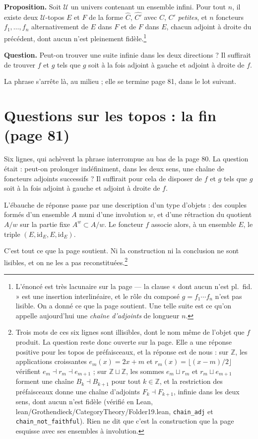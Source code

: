 \documentclass[11pt,a4paper]{article}
\begin{document}
\textbf{Proposition.} Soit $\mathcal{U}$ un univers contenant un ensemble
infini. Pour tout $n$, il existe deux $\mathcal{U}$-topos $E$ et $F$ de la
forme $\widehat{C}$, $\widehat{C'}$ avec $C$, $C'$ \emph{petites}, et $n$
foncteurs $f_{1}, \ldots, f_{n}$ alternativement de $E$ dans $F$ et de $F$ dans
$E$, chacun adjoint à droite du précédent, dont aucun n'est pleinement
fidèle.\footnote{L'énoncé est très lacunaire sur la page — la clause « dont
aucun n'est pl.\ fid. » est une insertion interlinéaire, et le rôle du composé
$g = f_{1}\cdots f_{n}$ n'est pas lisible. On a donné ce que la page
soutient. Une telle suite est ce qu'on appelle aujourd'hui une \emph{chaîne
d'adjoints} de longueur $n$.}

\textbf{Question.} Peut-on trouver une suite infinie dans les deux directions ?
Il suffirait de trouver $f$ et $g$ tels que $g$ soit à la fois adjoint à gauche
et adjoint à droite de $f$.

La phrase s'arrête là, au milieu ; elle se termine page 81, dans le lot
suivant.

\section*{Questions sur les topos : la fin (page 81)}

Six lignes, qui achèvent la phrase interrompue au bas de la page 80. La
question était : peut-on prolonger indéfiniment, dans les deux sens, une chaîne
de foncteurs adjoints successifs ? Il suffirait pour cela de disposer de $f$ et
$g$ tels que $g$ soit à la fois adjoint à gauche et adjoint à droite de $f$.

L'ébauche de réponse passe par une description d'un type d'objets : des couples
formés d'un ensemble $A$ muni d'une involution $w$, et d'une rétraction du
quotient $A/w$ sur la partie fixe $A^{w} \subset A/w$. Le foncteur $f$ associe
alors, à un ensemble $E$, le triple $(E, \mathrm{id}_{E}, E, \mathrm{id}_{E})$.

C'est tout ce que la page soutient. Ni la construction ni la conclusion ne sont
lisibles, et on ne les a pas reconstituées.\footnote{Trois mots de ces six
lignes sont illisibles, dont le nom même de l'objet que $f$ produit. La
question reste donc ouverte sur la page. Elle a une réponse positive pour les
topos de préfaisceaux, et la réponse est de nous : sur $\mathbb{Z}$, les
applications croissantes $e_{m}(x) = 2x + m$ et $r_{m}(x) = \lfloor (x - m)/2
\rfloor$ vérifient $e_{m} \dashv r_{m} \dashv e_{m+1}$ ; sur $\mathbb{Z}
\sqcup \mathbb{Z}$, les sommes $e_{m} \sqcup r_{m}$ et $r_{m} \sqcup e_{m+1}$
forment une chaîne $B_{k} \dashv B_{k+1}$ pour tout $k \in \mathbb{Z}$, et la
restriction des préfaisceaux donne une chaîne d'adjoints $F_{k} \dashv
F_{k+1}$, infinie dans les deux sens, dont aucun n'est fidèle (vérifié en Lean,
lean/Grothendieck/CategoryTheory/Folder19.lean, \texttt{chain\_adj} et
\texttt{chain\_not\_faithful}). Rien ne dit que c'est la construction que la
page esquisse avec ses ensembles à involution.}
\end{document}
